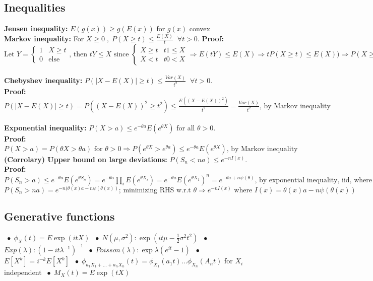 \documentclass[9pt]{extarticle}
\newcommand{\abs}[1]{\lvert#1\rvert}
\newcommand*\bspace{$\; \bullet \;$}
\begin{document}
\subsection{Inequalities}
\textbf{Jensen inequality: } $E(g(x)) \geq g(E(x))$ for $g(x)$ convex\\
\textbf{Markov inequality: } For $X\geq 0 \;, \;P(X \geq t) \leq \frac{E(X)}{t} \; \; \forall t>0$. \textbf{Proof: }\\
$\textrm{Let } Y = \begin{cases}
        1 & X \geq t\\
        0 & \textrm{else}
    \end{cases} \textrm{, then } tY \leq X \textrm{ since } \begin{cases}
        X \geq t & t1 \leq X \\
        X < t & t0 < X
    \end{cases} \Longrightarrow E(tY) \leq E(X) \Longrightarrow tP(X \geq t) \leq E(X)) \Longrightarrow P(X \geq t) \leq \frac{E(X)}{t}
$\\\\
\textbf{Chebyshev inequality: } $P(\abs{X - E(X)} \geq t) \leq \frac{Var(X)}{t^2} \; \; \forall t > 0$.\\
\textbf{Proof: } $P(\abs{X - E(X)} \geq t) = P((X - E(X))^2 \geq t^2) \leq \frac{E((X - E(X))^2)}{t^2} = \frac{Var(X)}{t^2} \textrm{, by Markov inequality}$\\\\
\textbf{Exponential inequality: } $P(X > a) \leq e^{-\theta a} E(e^{\theta X})$ for all $\theta > 0$.\\
\textbf{Proof:} $P(X > a) = P(\theta X > \theta a) \textrm{ for } \theta > 0 \Longrightarrow P(e^{\theta X} > e^{\theta a}) \leq e^{-\theta a} E(e^{\theta X}) \textrm{, by Markov inequality}$\\
\textbf{(Corrolary) Upper bound on large deviations: } $P(S_n < na) \leq e^{-nI(x)}$.\\
\textbf{Proof: } $P(S_n > a) \leq e^{-\theta a} E(e^{\theta S_n}) = e^{-\theta a} \prod_i E(e^{\theta X_i}) = e^{-\theta a} E(e^{\theta X_1})^n = e^{-\theta a + n \psi(\theta)} \textrm{, by exponential inequality, iid, where } \psi(\theta) = \log{Ee^{\theta X_1}}$\\
$P(S_n > na) = e^{-n(\theta(x) a - n \psi(\theta(x))} \textrm{; minimizing RHS w.r.t } \theta \Longrightarrow e^{-nI(x)} \textrm{ where } I(x) = \theta(x) a - n \psi(\theta(x))$

\subsection{Generative functions}
\bspace $\phi_X(t) = E \exp(itX)$ \bspace $N(\mu, \sigma^2): \exp(it\mu - \frac{1}{2}\sigma^2t^2)$ \bspace $Exp(\lambda): (1 - it\lambda ^{-1})^{-1}$ \bspace $Poisson(\lambda): \exp{\lambda(e^{it} - 1)}$ \bspace $E[X^k] = i^{-k}E[X^k]$ \bspace $\phi_{a_1X_1 + \dots + a_nX_n}(t) = \phi_{X_1}(a_1t) \dots \phi_{X_n}(A_nt)$ for $X_i$ independent \bspace $M_X(t) = E\exp(tX)$
\end{document}

